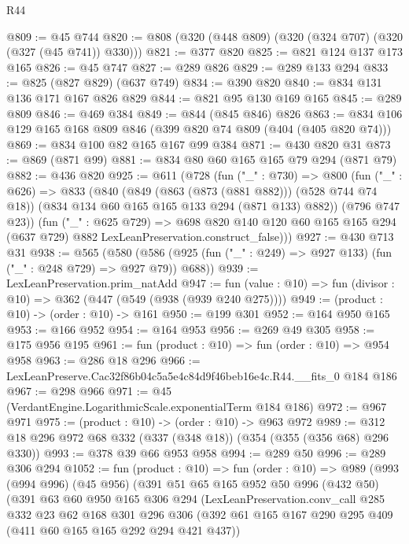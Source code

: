 \begin{lexlean}{R44}
\begin{coremodule}
@809 := @45 @744
@820 := @808 (@320 (@448 @809) (@320 (@324 @707) (@320 (@327 (@45 @741)) @330)))
@821 := @377 @820
@825 := @821 @124 @137 @173 @165
@826 := @45 @747
@827 := @289 @826
@829 := @289 @133 @294
@833 := @825 (@827 @829) (@637 @749)
@834 := @390 @820
@840 := @834 @131 @136 @171 @167 @826 @829
@844 := @821 @95 @130 @169 @165
@845 := @289 @809
@846 := @469 @384
@849 := @844 (@845 @846) @826
@863 := @834 @106 @129 @165 @168 @809 @846 (@399 @820 @74 @809 (@404 (@405 @820 @74)))
@869 := @834 @100 @82 @165 @167 @99 @384
@871 := @430 @820 @31
@873 := @869 (@871 @99)
@881 := @834 @80 @60 @165 @165 @79 @294 (@871 @79)
@882 := @436 @820
@925 := @611
    (@728
      (fun ("_" : @730) =>
      @800
        (fun ("_" : @626) =>
        @833
          (@840
            (@849 (@863 (@873 (@881 @882))) (@528 @744 @74 @18))
            (@834 @134 @60 @165 @165 @133 @294 (@871 @133) @882))
          (@796 @747 @23))
        (fun ("_" : @625 @729) =>
        @698
          @820
          @140
          @120
          @60
          @165
          @165
          @294
          (@637 @729)
          @882
          LexLeanPreservation.construct_false)))
@927 := @430 @713 @31
@938 := @565
    (@580 (@586 (@925 (fun ("_" : @249) => @927 @133) (fun ("_" : @248 @729) => @927 @79)) @688))
@939 := LexLeanPreservation.prim_natAdd
@947 := fun (value : @10) => fun (divisor : @10) => @362 (@447 (@549 (@938 (@939 @240 @275))))
@949 := (product : @10) -> (order : @10) -> @161
@950 := @199 @301
@952 := @164 @950 @165
@953 := @166 @952
@954 := @164 @953
@956 := @269 @49 @305
@958 := @175 @956 @195
@961 := fun (product : @10) => fun (order : @10) => @954 @958
@963 := @286 @18 @296
@966 := LexLeanPreserve.Cac32f86b04c5a5e4c84d9f46beb16e4c.R44.__fits_0 @184 @186
@967 := @298 @966
@971 := @45 (VerdantEngine.LogarithmicScale.exponentialTerm @184 @186)
@972 := @967 @971
@975 := (product : @10) -> (order : @10) -> @963 @972
@989 := @312 @18 @296 @972 @68 @332 (@337 (@348 @18)) (@354 (@355 (@356 @68) @296 @330))
@993 := @378 @39 @66 @953 @958
@994 := @289 @50
@996 := @289 @306 @294
@1052 := fun (product : @10) =>
  fun (order : @10) =>
  @989
    (@993
      (@994 @996)
      (@45 @956)
      (@391
        @51
        @65
        @165
        @952
        @50
        @996
        (@432 @50)
        (@391
          @63
          @60
          @950
          @165
          @306
          @294
          (LexLeanPreservation.conv_call
            @285
            @332
            @23
            @62
            @168
            @301
            @296
            @306
            (@392 @61 @165 @167 @290 @295 @409 (@411 @60 @165 @165 @292 @294 @421 @437))

\end{coremodule}
\end{lexlean}
